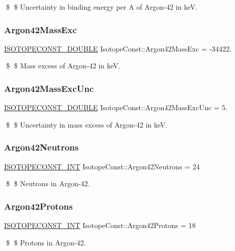 \$ \$ Uncertainty in binding energy per A of Argon-\/42 in keV. \mbox{\label{group___isotope_const-_argon-_ar42_ga2fcaa45f3a455b4cfd601e067bdcc672}} 
\subsubsection{\texorpdfstring{Argon42\+Mass\+Exc}{Argon42MassExc}}
{\footnotesize\ttfamily \mbox{\hyperlink{group___isotope_const-_macros_ga8f45a7272ce02c0b4c65c44636ed719a}{I\+S\+O\+T\+O\+P\+E\+C\+O\+N\+S\+T\+\_\+\+D\+O\+U\+B\+LE}} Isotope\+Const\+::\+Argon42\+Mass\+Exc = -\/34422.}

\$ \$ Mass excess of Argon-\/42 in keV. \mbox{\label{group___isotope_const-_argon-_ar42_ga45d6f2eece9c7e1417e4c95c2a52d5d9}} 
\subsubsection{\texorpdfstring{Argon42\+Mass\+Exc\+Unc}{Argon42MassExcUnc}}
{\footnotesize\ttfamily \mbox{\hyperlink{group___isotope_const-_macros_ga8f45a7272ce02c0b4c65c44636ed719a}{I\+S\+O\+T\+O\+P\+E\+C\+O\+N\+S\+T\+\_\+\+D\+O\+U\+B\+LE}} Isotope\+Const\+::\+Argon42\+Mass\+Exc\+Unc = 5.}

\$ \$ Uncertainty in mass excess of Argon-\/42 in keV. \mbox{\label{group___isotope_const-_argon-_ar42_gaa3777fee75cb328b01c90c9614afb4ad}} 
\subsubsection{\texorpdfstring{Argon42\+Neutrons}{Argon42Neutrons}}
{\footnotesize\ttfamily \mbox{\hyperlink{group___isotope_const-_macros_ga5f18360b3e99483a35c32d789e62621c}{I\+S\+O\+T\+O\+P\+E\+C\+O\+N\+S\+T\+\_\+\+I\+NT}} Isotope\+Const\+::\+Argon42\+Neutrons = 24}

\$ \$ Neutrons in Argon-\/42. \mbox{\label{group___isotope_const-_argon-_ar42_gaf84cebf769adfe37586fbff37ff7651a}} 
\subsubsection{\texorpdfstring{Argon42\+Protons}{Argon42Protons}}
{\footnotesize\ttfamily \mbox{\hyperlink{group___isotope_const-_macros_ga5f18360b3e99483a35c32d789e62621c}{I\+S\+O\+T\+O\+P\+E\+C\+O\+N\+S\+T\+\_\+\+I\+NT}} Isotope\+Const\+::\+Argon42\+Protons = 18}

\$ \$ Protons in Argon-\/42. 